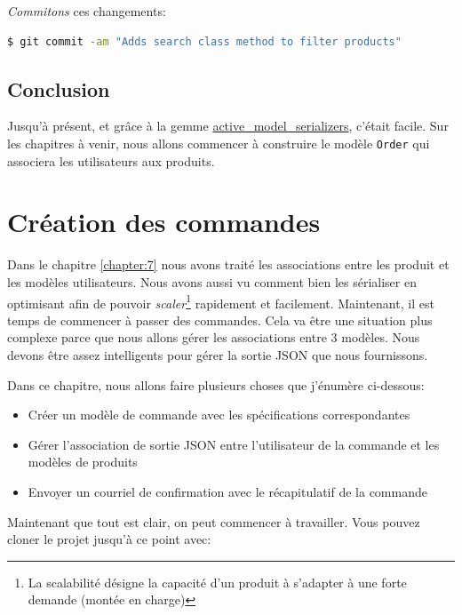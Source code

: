 \documentclass[]{report}
\begin{document}
      \textit{Commitons} ces changements:

      \begin{scriptsize}
        \begin{lstlisting}[language=bash]
        $ git commit -am "Adds search class method to filter products"
        \end{lstlisting}
      \end{scriptsize}

  \section{Conclusion}

    Jusqu'à présent, et grâce à la gemme \href{https://github.com/rails-api/active_model_serializers}{active\_model\_serializers}, c'était facile. Sur les chapitres à venir, nous allons commencer à construire le modèle \verb|Order| qui associera les utilisateurs aux produits.

\chapter{Création des commandes}\label{chapter:8}

  Dans le chapitre \ref{chapter:7} nous avons traité les associations entre les produit et les modèles utilisateurs. Nous avons aussi vu comment bien les sérialiser en optimisant afin de pouvoir \textit{scaler}\footnote{La scalabilité désigne la capacité d'un produit à s'adapter à une forte  demande (montée en charge)} rapidement et facilement. Maintenant, il est temps de commencer à passer des commandes. Cela va être une situation plus complexe parce que nous allons gérer les associations entre 3 modèles. Nous devons être assez intelligents pour gérer la sortie JSON que nous fournissons.

  Dans ce chapitre, nous allons faire plusieurs choses que j'énumère ci-dessous:

  \begin{itemize}
    \item Créer un modèle de commande avec les spécifications correspondantes
    \item Gérer l'association de sortie JSON entre l'utilisateur de la commande et les modèles de produits
    \item Envoyer un courriel de confirmation avec le récapitulatif de la commande
  \end{itemize}

  Maintenant que tout est clair, on peut commencer à travailler. Vous pouvez cloner le projet jusqu'à ce point avec:
\end{document}
